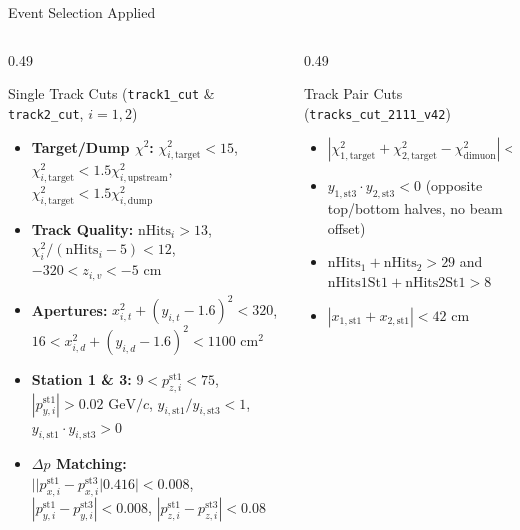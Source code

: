 \documentclass[aspectratio=169, 10pt]{beamer}
\begin{document}
\begin{frame}{Event Selection Applied}
\begin{columns}[T, onlytextwidth]
\begin{column}{0.49\textwidth}
        \begin{block}{\scriptsize Single Track Cuts (\texttt{track1\_cut} \& \texttt{track2\_cut}, $i=1,2$)}
            \tiny
            \begin{itemize}
                \item \textbf{Target/Dump $\chi^2$:} $\chi^2_{i,\text{target}} < 15$, $\chi^2_{i,\text{target}} < 1.5\chi^2_{i,\text{upstream}}$, $\chi^2_{i,\text{target}} < 1.5\chi^2_{i,\text{dump}}$
                \item \textbf{Track Quality:} $\text{nHits}_i > 13$, $\chi^2_i / (\text{nHits}_i - 5) < 12$, $-320 < z_{i,v} < -5\text{ cm}$
                \item \textbf{Apertures:} $x_{i,t}^2 + (y_{i,t} - 1.6)^2 < 320$, $16 < x_{i,d}^2 + (y_{i,d} - 1.6)^2 < 1100\text{ cm}^2$
                \item \textbf{Station 1 \& 3:} $9 < p_{z,i}^{\text{st1}} < 75$, $|p_{y,i}^{\text{st1}}| > 0.02\text{ GeV}/c$, $y_{i,\text{st1}}/y_{i,\text{st3}} < 1$, $y_{i,\text{st1}} \cdot y_{i,\text{st3}} > 0$
                \item \textbf{$\Delta p$ Matching:} $||p_{x,i}^{\text{st1}} - p_{x,i}^{\text{st3}}|0.416| < 0.008$, $|p_{y,i}^{\text{st1}} - p_{y,i}^{\text{st3}}| < 0.008$, $|p_{z,i}^{\text{st1}} - p_{z,i}^{\text{st3}}| < 0.08$
            \end{itemize}
        \end{block}
    \end{column}

    \begin{column}{0.49\textwidth}
        \begin{block}{\scriptsize Track Pair Cuts (\texttt{tracks\_cut\_2111\_v42})}
            \tiny
            \begin{itemize}
                \item $|\chi^2_{1,\text{target}} + \chi^2_{2,\text{target}} - \chi^2_{\text{dimuon}}| < 2.0$
                \item $y_{1,\text{st3}} \cdot y_{2,\text{st3}} < 0$ (opposite top/bottom halves, no beam offset)
                \item $\text{nHits}_1 + \text{nHits}_2 > 29$ and $\text{nHits1St1} + \text{nHits2St1} > 8$
                \item $|x_{1,\text{st1}} + x_{2,\text{st1}}| < 42\text{ cm}$
            \end{itemize}
        \end{block}


\end{column}
\end{columns}
\end{frame}
\end{document}
